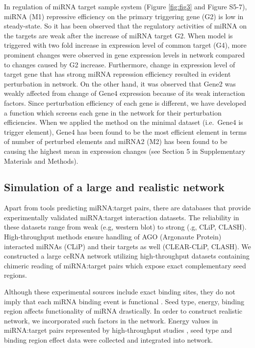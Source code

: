 \documentclass[a4,center,fleqn]{NAR}
\begin{document}
In regulation of miRNA target sample system (Figure \ref{fig:fig3} and
Figure S5-7), miRNA (M1) repressive efficiency on the primary triggering
gene (G2) is low in steady-state. So it has been observed that the
regulatory activities of miRNA on the targets are weak after the
increase of miRNA target G2. When model is triggered with two fold
increase in expression level of common target (G4), more prominent
changes were observed in gene expression levels in network compared to
changes caused by G2 increase. Furthermore, change in expression level
of target gene that has strong miRNA repression efficiency resulted in
evident perturbation in network. On the other hand, it was observed that
Gene2 was weakly affected from change of Gene4 expression because of its
weak interaction factors. Since perturbation efficiency of each gene is
different, we have developed a function which screens each gene in the
network for their perturbation efficiencies. When we applied the method
on the minimal dataset (i.e.~Gene4 is trigger element), Gene4 has been
found to be the most efficient element in terms of number of perturbed
elements and miRNA2 (M2) has been found to be causing the highest mean
in expression changes (see Section 5 in Supplementary Materials and
Methods).

\subsection{Simulation of a large and realistic network}

Apart from tools predicting miRNA:target pairs, there are databases that
provide experimentally validated miRNA:target interaction datasets. The
reliability in these datasets range from weak (e.g, western blot) to
strong (.g, CLiP, CLASH). High-throughput methods ensure handling of AGO
(Argonaute Protein) interacted miRNAs (CLiP) and their targets as well
(CLEAR-CLiP, CLASH). We constructed a large ceRNA network utilizing
high-throughput datasets containing chimeric reading of miRNA:target
pairs \citep{helwak_mapping_2013, moore_mirnatarget_2015} which expose
exact complementary seed regions.

Although these experimental sources include exact binding sites, they do
not imply that each miRNA binding event is functional
\citep{liu2019prediction}. Seed type, energy, binding region affects
functionality of miRNA drastically. In order to construct realistic
network, we incorporated such factors in the network. Energy values in
miRNA:target pairs represented by high-throughput studies
\citep{helwak_mapping_2013, moore_mirnatarget_2015}, seed type
\citep{grimson_microrna_2007, bartel_micrornas:_2009, betel2010comprehensive}
and binding region effect
\citep{hausser_analysis_2013, helwak_mapping_2013} data were collected
and integrated into network.
\end{document}
